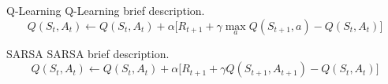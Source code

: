 \begin{frame}{Q-Learning}
    Q-Learning brief description.
    \begin{equation*}
        Q(S_t, A_t) \leftarrow Q(S_t, A_t) + \alpha \Big[ R_{t+1} +
            \gamma \max_{a} Q(S_{t+1}, a) - Q(S_t, A_t) \Big]
    \end{equation*}
\end{frame}

\begin{frame}{SARSA}
    SARSA brief description.
    \begin{equation*}
        Q(S_t, A_t) \leftarrow Q(S_t, A_t) + \alpha \Big[ R_{t+1} +
            \gamma Q(S_{t+1}, A_{t+1}) - Q(S_t, A_t) \Big]
    \end{equation*}
\end{frame}
